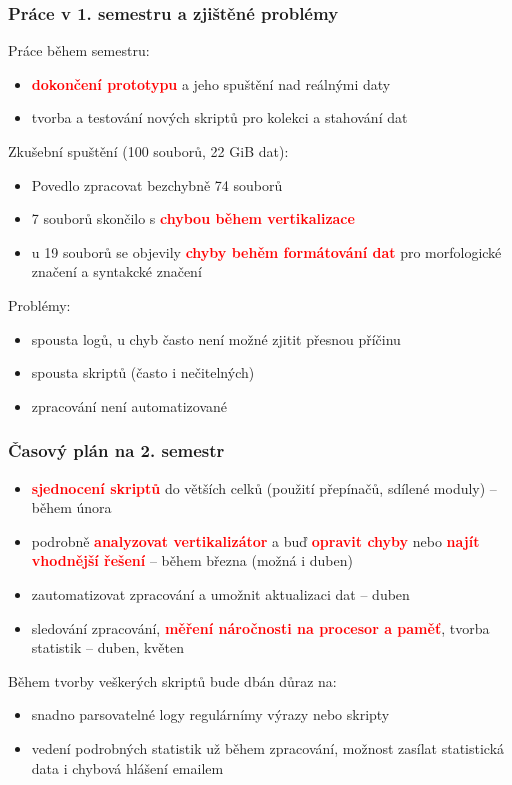 \documentclass{beamer}
\newcommand\br[1]{\textcolor{red}{\textbf{#1}}}
\begin{document}
  \begin{frame}
    \frametitle{Práce v 1. semestru a zjištěné problémy}
	Práce během semestru:
	\begin{itemize}
		\item \br{dokončení prototypu} a jeho spuštění nad reálnými daty
		\item tvorba a testování nových skriptů pro kolekci a stahování dat
	\end{itemize}
	Zkušební spuštění (100 souborů, 22 GiB dat):
	\begin{itemize}
		\item Povedlo zpracovat bezchybně 74 souborů
		\item 7 souborů skončilo s \br{chybou během vertikalizace}
		\item u 19 souborů se objevily \br{chyby behěm formátování dat} pro morfologické značení a syntakcké značení
	\end{itemize}
	Problémy:
	\begin{itemize}
		\item spousta logů, u chyb často není možné zjitit přesnou příčinu
		\item spousta skriptů (často i nečitelných)
		\item zpracování není automatizované
	\end{itemize}
  \end{frame}

  \begin{frame}
    \frametitle{Časový plán na 2. semestr}
	\begin{itemize}
		\item \br{sjednocení skriptů} do větších celků (použití přepínačů, sdílené moduly) -- během února
		\item podrobně \br{analyzovat vertikalizátor} a buď \br{opravit chyby} nebo \br{najít vhodnější řešení} -- během března (možná i duben)
		\item zautomatizovat zpracování a umožnit aktualizaci dat -- duben
		\item sledování zpracování, \br{měření náročnosti na procesor a paměť}, tvorba statistik -- duben, květen
	\end{itemize}
	Během tvorby veškerých skriptů bude dbán důraz na:
	\begin{itemize}
	  \item snadno parsovatelné logy regulárnímy výrazy nebo skripty
	  \item vedení podrobných statistik už během zpracování, možnost zasílat statistická data i chybová hlášení emailem
	\end{itemize}
  \end{frame}
\end{document}
